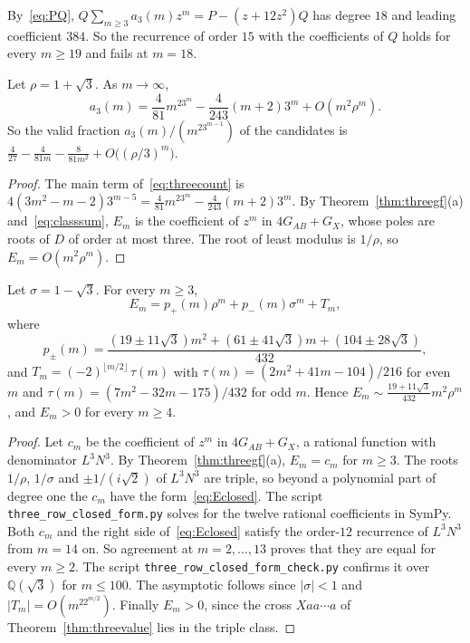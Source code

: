 By~\eqref{eq:PQ}, $Q\sum_{m\ge3}a_3(m)z^m=P-(z+12z^2)Q$ has degree $18$ and leading
coefficient $384$. So the recurrence of order $15$ with the coefficients of $Q$ holds for
every $m\ge19$ and fails at $m=18$.

\begin{corollary}[asymptotics]\label{cor:threeasymp}
Let $\rho=1+\sqrt3$. As $m\to\infty$,
\begin{equation}\label{eq:asymp1}
a_3(m)=\frac4{81}m^23^m-\frac4{243}(m+2)3^m+O(m^2\rho^m).
\end{equation}
So the valid fraction $a_3(m)/(m^23^{m-1})$ of the candidates is
$\frac4{27}-\frac4{81m}-\frac8{81m^2}+O\bigl((\rho/3)^m\bigr)$.
\end{corollary}

\begin{proof}
The main term of~\eqref{eq:threecount} is
$4(3m^2-m-2)3^{m-5}=\frac4{81}m^23^m-\frac4{243}(m+2)3^m$. By Theorem~\ref{thm:threegf}(a)
and~\eqref{eq:classsum}, $E_m$ is the coefficient of $z^m$ in $4G_{AB}+G_X$, whose poles are roots of $D$ of order at
most three. The root of least modulus is $1/\rho$, so $E_m=O(m^2\rho^m)$.
\end{proof}

\begin{theorem}\label{thm:threeclosed}
Let $\sigma=1-\sqrt3$. For every $m\ge3$,
\begin{equation}\label{eq:Eclosed}
E_m=p_+(m)\rho^m+p_-(m)\sigma^m+T_m,
\end{equation}
where
\[
p_\pm(m)=\frac{(19\pm11\sqrt3)m^2+(61\pm41\sqrt3)m+(104\pm28\sqrt3)}{432},
\]
and $T_m=(-2)^{\lfloor m/2\rfloor}\,\tau(m)$ with $\tau(m)=(2m^2+41m-104)/216$ for even $m$ and
$\tau(m)=(7m^2-32m-175)/432$ for odd $m$. Hence $E_m\sim\frac{19+11\sqrt3}{432}m^2\rho^m$, and $E_m>0$ for every $m\ge4$.
\end{theorem}

\begin{proof}
Let $c_m$ be the coefficient of $z^m$ in $4G_{AB}+G_X$, a rational function with denominator
$L^3N^3$. By Theorem~\ref{thm:threegf}(a), $E_m=c_m$ for $m\ge3$. The roots $1/\rho$, $1/\sigma$
and $\pm1/(i\sqrt2)$ of $L^3N^3$ are triple, so beyond a polynomial part of degree one the
$c_m$ have the form~\eqref{eq:Eclosed}. The script \texttt{three\_row\_closed\_form.py} solves for
the twelve rational coefficients in SymPy. Both $c_m$ and the right side of~\eqref{eq:Eclosed}
satisfy the order-$12$ recurrence of $L^3N^3$ from $m=14$ on. So agreement at $m=2,\dots,13$
proves that they are equal for every $m\ge2$. The script \texttt{three\_row\_closed\_form\_check.py}
confirms it over $\mathbb Q(\sqrt3)$ for $m\le100$. The asymptotic follows since $|\sigma|<1$
and $|T_m|=O(m^22^{m/2})$. Finally $E_m>0$, since the cross $Xaa\cdots a$ of
Theorem~\ref{thm:threevalue} lies in the triple class.
\end{proof}


